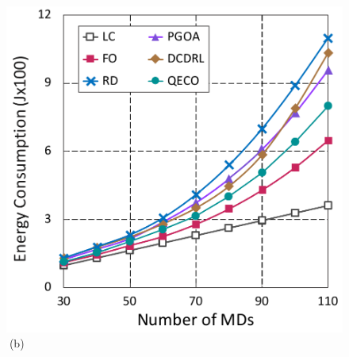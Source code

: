 \documentclass[12pt,draftclsnofoot,onecolumn]{IEEEtran}
\begin{document}
\begin{enumerate}
\begin{figure}[H]
\begin{minipage}[b]{0.3\linewidth}
		\includegraphics[width=\textwidth]{ energy_2}
		\textcolor{white}{i}\hspace{0.6cm}(b)
	\end{minipage}
	

\end{figure}
\end{enumerate}
\end{document}
